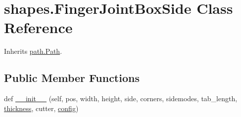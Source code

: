 \hypertarget{classshapes_1_1_finger_joint_box_side}{}\section{shapes.\+Finger\+Joint\+Box\+Side Class Reference}
\label{classshapes_1_1_finger_joint_box_side}


Inherits \hyperlink{classpath_1_1_path}{path.\+Path}.

\subsection*{Public Member Functions}
\begin{DoxyCompactItemize}
\item 
def \hyperlink{classshapes_1_1_finger_joint_box_side_a8e9345153cd602774dba620ea4fffac5}{\+\_\+\+\_\+init\+\_\+\+\_\+} (self, pos, width, height, side, corners, sidemodes, tab\+\_\+length, \hyperlink{classshapes_1_1_finger_joint_box_side_a1b08f1a625b6b1bca02dc4dd42d515ea}{thickness}, cutter, \hyperlink{classpath_1_1_path_a889e352f02dba833077975ce855276ed}{config})
\end{DoxyCompactItemize}
